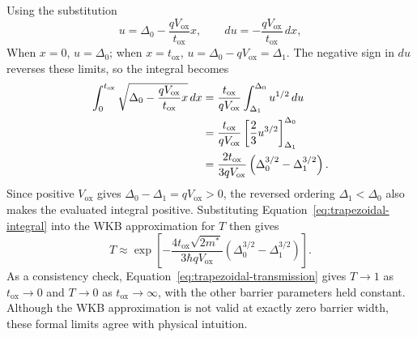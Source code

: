 \documentclass[12pt]{article}
\begin{document}
Using the substitution
\begin{equation}
    u=\Delta_0-\frac{qV_{\mathrm{ox}}}{t_{\mathrm{ox}}}x,
    \qquad
    du=-\frac{qV_{\mathrm{ox}}}{t_{\mathrm{ox}}}\,dx,
    \label{eq:trapezoidal-substitution}
\end{equation}
When \(x=0\), \(u=\Delta_0\); when \(x=t_{\mathrm{ox}}\), \(u=\Delta_0-qV_{\mathrm{ox}}=\Delta_1\). The negative sign in \(du\) reverses these limits, so the integral becomes
\begin{align}
    \int_0^{t_{\mathrm{ox}}}
    \sqrt{
        \Delta_0-
        \frac{qV_{\mathrm{ox}}}{t_{\mathrm{ox}}}x
    }\,dx
    &=
    \frac{t_{\mathrm{ox}}}{qV_{\mathrm{ox}}}
    \int_{\Delta_1}^{\Delta_0}u^{1/2}\,du
    \notag\\
    &=
    \frac{t_{\mathrm{ox}}}{qV_{\mathrm{ox}}}
    \left[
        \frac{2}{3}u^{3/2}
    \right]_{\Delta_1}^{\Delta_0}
    \notag\\
    &=
    \frac{2t_{\mathrm{ox}}}{3qV_{\mathrm{ox}}}
    \left(
        \Delta_0^{3/2}-\Delta_1^{3/2}
    \right).
    \label{eq:trapezoidal-integral}
\end{align}
Since positive \(V_{\mathrm{ox}}\) gives \(\Delta_0-\Delta_1=qV_{\mathrm{ox}}>0\), the reversed ordering \(\Delta_1<\Delta_0\) also makes the evaluated integral positive. Substituting Equation~\eqref{eq:trapezoidal-integral} into the WKB approximation for \(T\) then gives
\begin{equation}
    T\approx
    \exp\left[
        -\frac{4t_{\mathrm{ox}}\sqrt{2m^*}}
        {3\hbar qV_{\mathrm{ox}}}
        \left(
            \Delta_0^{3/2}-\Delta_1^{3/2}
        \right)
    \right].
    \label{eq:trapezoidal-transmission}
\end{equation}
As a consistency check, Equation~\eqref{eq:trapezoidal-transmission} gives \(T\to1\) as \(t_{\mathrm{ox}}\to0\) and \(T\to0\) as \(t_{\mathrm{ox}}\to\infty\), with the other barrier parameters held constant. Although the WKB approximation is not valid at exactly zero barrier width, these formal limits agree with physical intuition.
\end{document}
